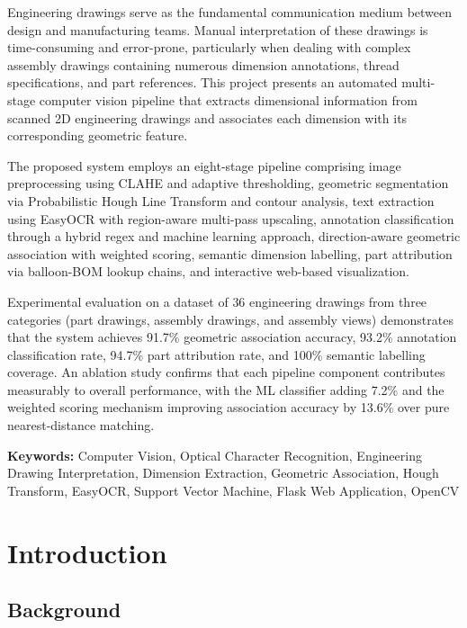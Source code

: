 \documentclass[12pt,a4paper]{article}
\begin{document}
Engineering drawings serve as the fundamental communication medium between design and manufacturing teams. Manual interpretation of these drawings is time-consuming and error-prone, particularly when dealing with complex assembly drawings containing numerous dimension annotations, thread specifications, and part references. This project presents an automated multi-stage computer vision pipeline that extracts dimensional information from scanned 2D engineering drawings and associates each dimension with its corresponding geometric feature.

The proposed system employs an eight-stage pipeline comprising image preprocessing using CLAHE and adaptive thresholding, geometric segmentation via Probabilistic Hough Line Transform and contour analysis, text extraction using EasyOCR with region-aware multi-pass upscaling, annotation classification through a hybrid regex and machine learning approach, direction-aware geometric association with weighted scoring, semantic dimension labelling, part attribution via balloon-BOM lookup chains, and interactive web-based visualization.

Experimental evaluation on a dataset of 36 engineering drawings from three categories (part drawings, assembly drawings, and assembly views) demonstrates that the system achieves 91.7\% geometric association accuracy, 93.2\% annotation classification rate, 94.7\% part attribution rate, and 100\% semantic labelling coverage. An ablation study confirms that each pipeline component contributes measurably to overall performance, with the ML classifier adding 7.2\% and the weighted scoring mechanism improving association accuracy by 13.6\% over pure nearest-distance matching.

\vspace{0.5cm}
\noindent\textbf{Keywords:} Computer Vision, Optical Character Recognition, Engineering Drawing Interpretation, Dimension Extraction, Geometric Association, Hough Transform, EasyOCR, Support Vector Machine, Flask Web Application, OpenCV

\newpage
\section{Introduction}

\subsection{Background}
\end{document}
